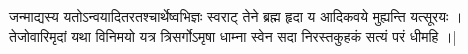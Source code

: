 जन्माद्यस्य यतोऽन्वयादितरतश्चार्थेष्वभिज्ञः स्वराट् 
तेने ब्रह्म हृदा य आदिकवये मुह्यन्ति यत्सूरयः ।
तेजोवारिमृदां यथा विनिमयो यत्र त्रिसर्गोऽमृषा
धाम्ना स्वेन सदा निरस्तकुहकं सत्यं परं धीमहि ।|
